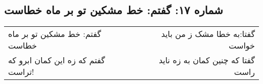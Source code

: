 \begin{center}
\section*{شماره ۱۷: گفتم: خط مشکین تو بر ماه خطاست}
\label{sec:017}
\begin{longtable}{l p{0.5cm} r}
گفتم: خط مشکین تو بر ماه خطاست
&&
گفتا:‌به خطا مشک ز من باید خواست
\\
گفتم که زه این کمان ابرو که تراست!
&&
گفتا که چنین کمان به زه ناید راست
\\
\end{longtable}
\end{center}
